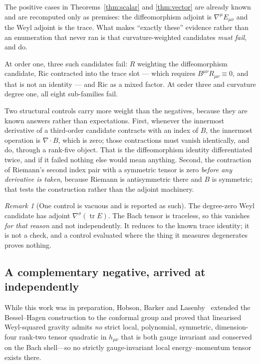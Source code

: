 \documentclass[11pt]{article}
\theoremstyle{definition}
\theoremstyle{remark}
\newtheorem{remark}[theorem]{Remark}
\begin{document}
The positive cases in Theorems~\ref{thm:scalar} and \ref{thm:vector} are
already known and are recomputed only as premises: the diffeomorphism adjoint
is \(\nabla^{\mu}E_{\mu\nu}\) and the Weyl adjoint is the trace.  What makes
``exactly these'' evidence rather than an enumeration that never ran is that
curvature-weighted candidates \emph{must fail}, and do.

At order one, three such candidates fail: \(R\) weighting the diffeomorphism
candidate, \(\mathrm{Ric}\) contracted into the trace slot --- which requires
\(B^{\mu\nu}R_{\mu\nu}\equiv0\), and that is not an identity --- and
\(\mathrm{Ric}\) as a mixed factor.  At order three and curvature degree one,
all eight sub-families fail.

Two structural controls carry more weight than the negatives, because they are
known answers rather than expectations.  First, whenever the innermost
derivative of a third-order candidate contracts with an index of \(B\), the
innermost operation is \(\nabla\!\cdot\!B\), which is zero; those contractions
must vanish identically, and do, through a rank-five object.  That is the
diffeomorphism identity differentiated twice, and if it failed nothing else
would mean anything.  Second, the contraction of Riemann's second index pair
with a symmetric tensor is zero \emph{before any derivative is taken}, because
Riemann is antisymmetric there and \(B\) is symmetric; that tests the
construction rather than the adjoint machinery.

\begin{remark}[One control is vacuous and is reported as such]
The degree-zero Weyl candidate has adjoint \(\nabla^{\sigma}(\operatorname{tr}
E)\).  The Bach tensor is traceless, so this vanishes \emph{for that reason}
and not independently.  It reduces to the known trace identity; it is not a
check, and a control evaluated where the thing it measures degenerates proves
nothing.
\end{remark}

\subsection*{A complementary negative, arrived at independently}

While this work was in preparation, Hobson, Barker and
Lasenby~\cite{HobsonBarkerLasenby2026} extended the Bessel--Hagen
construction to the conformal group and proved that linearised Weyl-squared
gravity admits \emph{no} strict local, polynomial, symmetric,
dimension-four rank-two tensor quadratic in \(h_{\mu\nu}\) that is both gauge
invariant and conserved on the Bach shell---so no strictly gauge-invariant
local energy--momentum tensor exists there.
\end{document}

